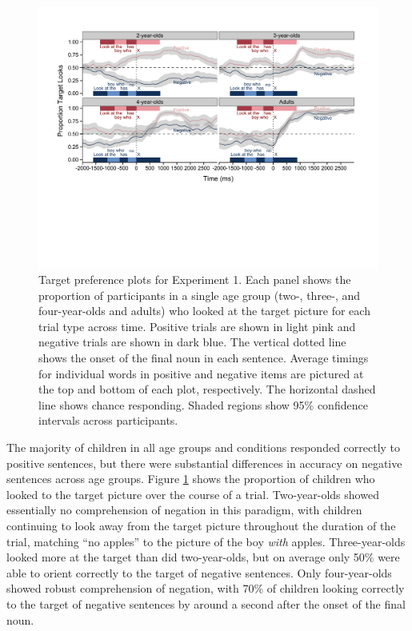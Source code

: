 \documentclass[man]{apa2}
\begin{document}
\begin{figure}
\begin{center} 
\includegraphics[width=6in]{simpleplots_nothing.pdf}
\caption{\label{fig:e1simple} Target preference plots for Experiment 1. Each panel shows the proportion of participants in a single age group (two-, three-, and four-year-olds and adults) who looked at the target picture for each trial type across time. Positive trials are shown in light pink and negative trials are shown in dark blue.  The vertical dotted line shows the onset of the final noun in each sentence. Average timings for individual words in positive and negative items are pictured at the top and bottom of each plot, respectively. The horizontal dashed line shows chance responding. Shaded regions show 95\% confidence intervals across participants.}
\end{center} 
\end{figure}

The majority of children in all age groups and conditions responded correctly to positive sentences, but there were substantial differences in accuracy on negative sentences across age groups. Figure \ref{fig:e1simple} shows the proportion of children who looked to the target picture over the course of a trial. Two-year-olds showed essentially no comprehension of negation in this paradigm, with children continuing to look away from the target picture throughout the duration of the trial, matching ``no apples'' to the picture of the boy \emph{with} apples.  Three-year-olds looked more at the target than did two-year-olds, but on average only 50\% were able to orient correctly to the target of negative sentences.  Only four-year-olds showed robust comprehension of negation, with 70\% of children looking correctly to the target of negative sentences by around a second after the onset of the final noun.  
\end{document}
